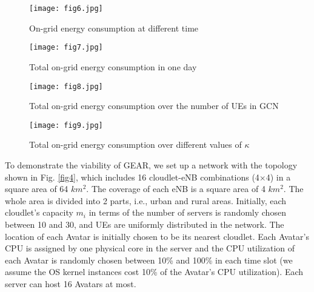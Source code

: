 \documentclass[journal,12pt,draftclsnofoot,onecolumn]{IEEEtran}
\begin{document}
\begin{figure}[!htb]
	\centering	
\texttt{[image: fig6.jpg]}
	\caption{On-grid energy consumption at different time}
	\label{fig6}
\end{figure}
\begin{figure}[!htb]
	\centering	
\texttt{[image: fig7.jpg]}
	\caption{Total on-grid energy consumption in one day}	
	\label{fig7}
\end{figure}
\begin{figure}[!htb]
	\centering	
\texttt{[image: fig8.jpg]}
	\caption{Total on-grid energy consumption over the  number of UEs in GCN}
	\label{fig8}
\end{figure}
\begin{figure}[!htb]
	\centering	
\texttt{[image: fig9.jpg]}
	\caption{Total on-grid energy consumption over different values of $\kappa$}	
	\label{fig9}
\end{figure}

To demonstrate the viability of GEAR, we set up a network with the topology shown in Fig. \ref{fig4}, which includes 16 cloudlet-eNB combinations (4$\times$4) in a square area of 64 $km^2$. The coverage of each eNB is a square area of 4 $km^2$. The whole area is divided into 2 parts, i.e., urban and rural areas. Initially, each cloudlet's capacity $m_i$ in terms of the number of servers is randomly chosen between 10 and 30, and UEs are uniformly distributed in the network. The location of each Avatar is initially chosen to be its nearest cloudlet. Each Avatar's CPU is assigned by one physical core in the server and the CPU utilization of each Avatar is randomly chosen between 10\% and 100\% in each time slot (we assume the OS kernel instances cost 10\% of the Avatar's CPU utilization). Each server can host 16 Avatars at most.\
\end{document}
